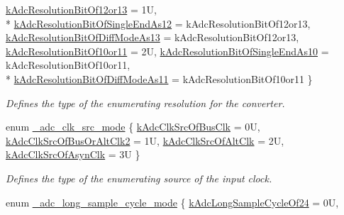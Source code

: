 \begin{DoxyCompactItemize}
\hyperlink{group__adc__hal_ggaee9345624eca4f249688e14aa9369108a1bbbd6c1426b79dd6b8d6e9c13a317b4}{k\+Adc\+Resolution\+Bit\+Of12or13} = 1U, 
\\*
\hyperlink{group__adc__hal_ggaee9345624eca4f249688e14aa9369108afb4fab22e3ecbee4c88c72cf0ac5c485}{k\+Adc\+Resolution\+Bit\+Of\+Single\+End\+As12} = k\+Adc\+Resolution\+Bit\+Of12or13, 
\hyperlink{group__adc__hal_ggaee9345624eca4f249688e14aa9369108a49389b420228696541ce8fe287ec084c}{k\+Adc\+Resolution\+Bit\+Of\+Diff\+Mode\+As13} = k\+Adc\+Resolution\+Bit\+Of12or13, 
\hyperlink{group__adc__hal_ggaee9345624eca4f249688e14aa9369108a8e9c088979154fc3c2761ea4e1f5c6f4}{k\+Adc\+Resolution\+Bit\+Of10or11} = 2U, 
\hyperlink{group__adc__hal_ggaee9345624eca4f249688e14aa9369108a197699d2baeba9596a3c4980b8cb0ac6}{k\+Adc\+Resolution\+Bit\+Of\+Single\+End\+As10} = k\+Adc\+Resolution\+Bit\+Of10or11, 
\\*
\hyperlink{group__adc__hal_ggaee9345624eca4f249688e14aa9369108aac5acd19a349df5745a17a9b9edab0ac}{k\+Adc\+Resolution\+Bit\+Of\+Diff\+Mode\+As11} = k\+Adc\+Resolution\+Bit\+Of10or11
 \}\begin{DoxyCompactList}\small\item\em Defines the type of the enumerating resolution for the converter. \end{DoxyCompactList}
\item 
enum \hyperlink{group__adc__hal_ga94a1d7e8db5d03f6dd77cfcf96e3d1f1}{\+\_\+adc\+\_\+clk\+\_\+src\+\_\+mode} \{ \hyperlink{group__adc__hal_gga94a1d7e8db5d03f6dd77cfcf96e3d1f1a5596df30b880af9cd583838ffcfad7aa}{k\+Adc\+Clk\+Src\+Of\+Bus\+Clk} = 0U, 
\hyperlink{group__adc__hal_gga94a1d7e8db5d03f6dd77cfcf96e3d1f1a894347fa38577b19dc8f41e77c873045}{k\+Adc\+Clk\+Src\+Of\+Bus\+Or\+Alt\+Clk2} = 1U, 
\hyperlink{group__adc__hal_gga94a1d7e8db5d03f6dd77cfcf96e3d1f1abb2e718275ab27822b74b80ab841d456}{k\+Adc\+Clk\+Src\+Of\+Alt\+Clk} = 2U, 
\hyperlink{group__adc__hal_gga94a1d7e8db5d03f6dd77cfcf96e3d1f1a60d54e07c41a6c51e74ceccf2568a12b}{k\+Adc\+Clk\+Src\+Of\+Asyn\+Clk} = 3U
 \}\begin{DoxyCompactList}\small\item\em Defines the type of the enumerating source of the input clock. \end{DoxyCompactList}
\item 
enum \hyperlink{group__adc__hal_gaf94ec953aeb0bd7abe1364f39e75b135}{\+\_\+adc\+\_\+long\+\_\+sample\+\_\+cycle\+\_\+mode} \{ \hyperlink{group__adc__hal_ggaf94ec953aeb0bd7abe1364f39e75b135a862c791c8a6cc632cf9044f9a1c60fd7}{k\+Adc\+Long\+Sample\+Cycle\+Of24} = 0U, 

\end{DoxyCompactItemize}
